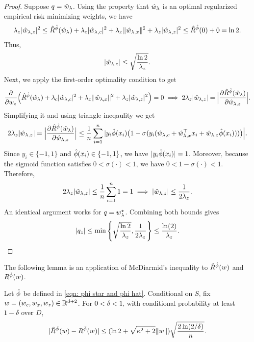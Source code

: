 \begin{proof}
Suppose $q = \hat{w}_\lambda$. Using the property that $\hat{w}_\lambda$ is an optimal regularized empirical risk minimizing weights, we have 
\[
\lambda_z|\hat{w}_{\lambda,z}|^2 \le \hat{R}^{\hat{\phi}}(\hat{w}_\lambda) + \lambda_c|\hat{w}_{\lambda,c}|^2 + \lambda_x\|\hat{w}_{\lambda,x}\|^2 + \lambda_z|\hat{w}_{\lambda,z}|^2 \le \hat{R}^{\hat{\phi}}(0) + 0 = \ln 2.
\]
Thus,
\[
|\hat{w}_{\lambda,z}| \le \sqrt{\frac{\ln 2}{\lambda_z}}.
\]
Next, we apply the first-order optimality condition to get 
$$\frac{\partial}{\partial w_z}\Big(\hat{R}^{\hat{\phi}}(\hat{w}_\lambda)  + \lambda_c|\hat{w}_{\lambda,c}|^2 + \lambda_x\|\hat{w}_{\lambda,x}\|^2 + \lambda_z|\hat{w}_{\lambda,z}|^2\Big) = 0 \implies 2\lambda_z|\hat{w}_{\lambda,z}| = \Big|\frac{\partial \hat{R}^{\hat{\phi}}(\hat{w}_\lambda)}{\partial \hat{w}_{\lambda,z}}\Big|.$$ 
Simplifying it and using triangle ineqaulity we get
\[
2\lambda_z |\hat{w}_{\lambda,z}| = \Big|\frac{\partial \hat{R}^{\hat{\phi}}(\hat{w}_\lambda)}{\partial \hat{w}_{\lambda,z}}\Big| \le \frac{1}{n}\sum_{i=1}^n |y_i\hat{\phi}(x_i)\big(1 - \sigma(y_i(\hat{w}_{\lambda,c} + \hat{w}_{\lambda,x}^\top x_i + \hat{w}_{\lambda,z}\hat{\phi}(x_i)))\big)\Big|.
\]
Since $y_i \in \{-1,1\}$ and $\hat{\phi}(x_i) \in \{-1,1\}$, we have $|y_i\hat{\phi}(x_i)| = 1$. Moreover, because the sigmoid function satisfies $0 < \sigma(\cdot) < 1$, we have $0 < 1 - \sigma(\cdot) < 1$. Therefore,
\[
2\lambda_z|\hat{w}_{\lambda,z}| \le \frac{1}{n}\sum_{i=1}^n 1 = 1 \implies |\hat{w}_{\lambda,z}| \le \frac{1}{2\lambda_z}.
\]
An identical argument works for $q = w^\star_{\lambda}$. Combining both bounds gives
\[
|q_z| \le \min\left\{\sqrt{\frac{\ln 2}{\lambda_z}}, \frac{1}{2\lambda_z}\right\} \le \frac{\ln(2)}{\lambda_z}.
\]
\end{proof}

The following lemma is an application of McDiarmid's inequality to $\hat{R}^{\hat{\phi}}(w)$ and $R^{\hat{\phi}}(w)$.

\begin{lem}\label{lem: McDiamird's inequality}
Let $\hat{\phi}$ be defined in \eqref{eqn: phi star and phi hat}.
Conditional on $S$, fix $w=(w_c,w_x,w_z)\in\mathbb{R}^{d+2}$. For $0<\delta<1$, with conditional probability at least
$1-\delta$ over $D$,
\begin{equation}
|\hat{R}^{\hat{\phi}}(w)-R^{\hat{\phi}}(w)|
\leq(\ln2+\sqrt{\kappa^2+2}\|w\|)
       \sqrt{\frac{2\ln(2/\delta)}{n}}.
\end{equation}
\end{lem}

